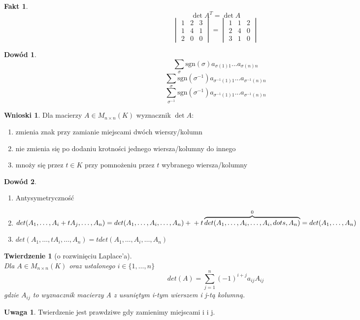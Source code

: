 \documentclass[12pt,a4paper]{article}
\theoremstyle{plain}
\newtheorem{tw}{Twierdzenie}[section]
\theoremstyle{definition}
\newtheorem{ft}{Fakt}[section]
\theoremstyle{definition}
\theoremstyle{definition}
\theoremstyle{definition}
\newtheorem*{dd}{Dowód}
\theoremstyle{definition}
\theoremstyle{definition}
\theoremstyle{definition}
\theoremstyle{definition}
\newtheorem*{uw}{Uwaga}
\theoremstyle{definition}
\newtheorem*{wn}{Wnioski}
\begin{document}
\begin{ft}
    \[\det A^T = \det A\]
  \[\begin{vmatrix}1&2&3\\1&4&1\\2&0&0\end{vmatrix}
    =\begin{vmatrix}1&1&2\\2&4&0\\3&1&0\end{vmatrix}\]
\end{ft}
\begin{dd}
    \[\sum_\sigma\mathrm{sgn}(\sigma)a_{\sigma(1)1}...a_{\sigma(n)n}\]
    \[\sum_\sigma\mathrm{sgn}(\sigma^{-1})a_{\sigma^{-1}(1)1}...a_{\sigma^{-1}(n)n}\]
    \[\sum_{\sigma^{-1}}\mathrm{sgn}(\sigma^{-1})a_{\sigma^{-1}(1)1}...a_{\sigma^{-1}(n)n}\]
\end{dd}
\newpage
\begin{wn}
    Dla macierzy $A \in M_{n \times n}(K)$ wyznacznik $\det A$:
    \begin{enumerate}[{(}1{)}]
        \item zmienia znak przy zamianie miejscami dwóch wierszy/kolumn
        \item nie zmienia się po dodaniu krotności jednego wiersza/kolumny do innego
        \item mnoży się przez $t \in K$ przy pomnożeniu przez $t$ wybranego
          wiersza/kolumny
    \end{enumerate}
\end{wn}

\begin{dd} \hfill
    \begin{enumerate}[{(}1{)}]
        \item Antysymetryczność
        \item $det(A_1,\dots,A_i+tA_j,\dots,A_n) = det(A_1,\dots,A_i,\dots,A_n) + \\ + t \overbrace{det(A_1,\dots,A_i,\dots,A_i
        ,dots,A_n)}^0 = det(A_1,\dots,A_n)$
        \item $det(A_1,\dots,tA_i,\dots,A_n) = t det(A_1,\dots,A_i,\dots,A_n)$
    \end{enumerate}
\end{dd}

\begin{tw}[o rozwinięciu Laplace'a] ~\\
    Dla $A \in M_{n \times n} (K) $ oraz ustalonego $i \in \{1,\dots,n\}$ 
        $$det(A) = \sum_{j=1}^n (-1)^{i+j} a_{ij} A_{ij}$$
        gdzie $A_{ij}$ to wyznacznik macierzy A z usuniętym i-tym wierszem i j-tą kolumną. 
        \end{tw}
\begin{uw}
    Twierdzenie jest prawdziwe gdy zamienimy miejscami i i j.
\end{uw}
\end{document}
